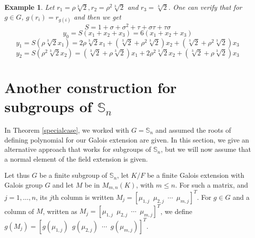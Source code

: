 \documentclass[12pt]{article}
\theoremstyle{plain}
\newtheorem{example}[theorem]{Example}
\begin{document}
\begin{example}

Let $r_1 = \rho \sqrt[3]{2}, r_2 = \rho^2 \sqrt[3]{2}$ and $r_3 = \sqrt[3]{2}$. One can verify that for $g \in G$, $g(r_i) = r_{g(i)}$ and then we get
 $$S= 1+\sigma +\sigma^2 +\tau +\sigma \tau +\tau \sigma $$
 $$y_0 = S(x_1+ x_2 + x_3)= 6(x_1+x_2+x_3)$$
 $$ y_1 = S(\rho \sqrt[3]{2} x_1) = 2\rho\sqrt[3]{2}x_1+(\sqrt[3]{2}+\rho^2 \sqrt[3]{2})x_2 + (\sqrt[3]{2}+\rho^2 \sqrt[3]{2})x_3 $$
 $$ y_2 = S(\rho^2\sqrt[3]{2}x_2) = (\sqrt[3]{2}+\rho \sqrt[3]{2})x_1 + 2\rho^2\sqrt[3]{2}x_2 + (\sqrt[3]{2}+\rho \sqrt[3]{2})x_3$$
 \end{example}

\section{Another construction for subgroups of $\mathbb{S}_n$}

In Theorem \ref{specialcase}, we worked with $G=\mathbb{S}_n$ and
assumed the roots of defining polynomial for our Galois extension are
given.  In this section, we give an alternative approach that works
for subgroups of $\mathbb{S}_n$, but we will now assume that a normal
element of the field extension is given.

Let thus $G$ be a finite subgroup of $\mathbb{S}_n$, let $K/F$ be a
finite Galois extension with Galois group $G$ and let $M$ be in
$M_{m,n}(K)$, with $m \leq n$. For such a matrix, and $j=1,\dots,n$,
its $j$th column is written $M_j=\left[\mu_{1,j} \,\,\, \mu_{2,j}
  \,\,\, \cdots \,\,\, \mu_{m,j}\right]^T$. For $g \in G$ and a column
of $M$, written as $M_j = \left[\mu_{1,j} \,\,\, \mu_{2,j} \,\,\,
  \cdots \,\,\, \mu_{m,j}\right]^T$, we define $g(M_j) =
\left[g(\mu_{1,j}) \,\,\, g(\mu_{2,j}) \,\,\, \cdots \,\,\,
  g(\mu_{m,j})\right]^T$.
\end{document}
